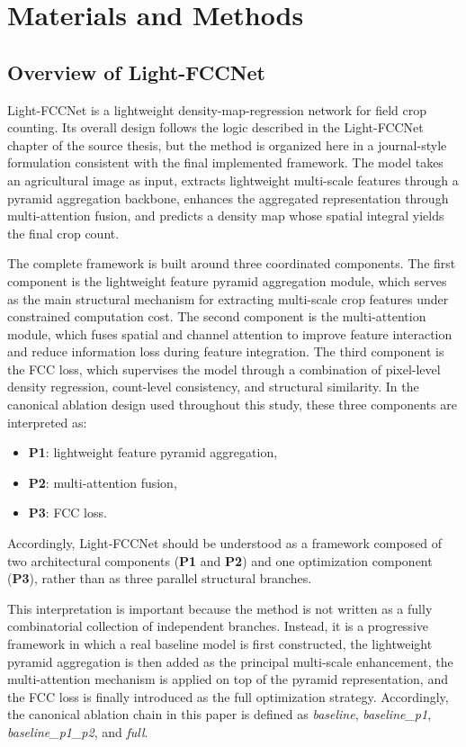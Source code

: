 \documentclass[a4paper,fleqn]{cas-sc}
\begin{document}
\section{Materials and Methods}

\subsection{Overview of Light-FCCNet}

Light-FCCNet is a lightweight density-map-regression network for field crop counting. Its overall design follows the logic described in the Light-FCCNet chapter of the source thesis, but the method is organized here in a journal-style formulation consistent with the final implemented framework. The model takes an agricultural image as input, extracts lightweight multi-scale features through a pyramid aggregation backbone, enhances the aggregated representation through multi-attention fusion, and predicts a density map whose spatial integral yields the final crop count.

The complete framework is built around three coordinated components. The first component is the lightweight feature pyramid aggregation module, which serves as the main structural mechanism for extracting multi-scale crop features under constrained computation cost. The second component is the multi-attention module, which fuses spatial and channel attention to improve feature interaction and reduce information loss during feature integration. The third component is the FCC loss, which supervises the model through a combination of pixel-level density regression, count-level consistency, and structural similarity. In the canonical ablation design used throughout this study, these three components are interpreted as:
\begin{itemize}
    \item \textbf{P1}: lightweight feature pyramid aggregation,
    \item \textbf{P2}: multi-attention fusion,
    \item \textbf{P3}: FCC loss.
\end{itemize}
Accordingly, Light-FCCNet should be understood as a framework composed of two architectural components (\textbf{P1} and \textbf{P2}) and one optimization component (\textbf{P3}), rather than as three parallel structural branches.

This interpretation is important because the method is not written as a fully combinatorial collection of independent branches. Instead, it is a progressive framework in which a real baseline model is first constructed, the lightweight pyramid aggregation is then added as the principal multi-scale enhancement, the multi-attention mechanism is applied on top of the pyramid representation, and the FCC loss is finally introduced as the full optimization strategy. Accordingly, the canonical ablation chain in this paper is defined as \textit{baseline}, \textit{baseline\_p1}, \textit{baseline\_p1\_p2}, and \textit{full}.
\end{document}
